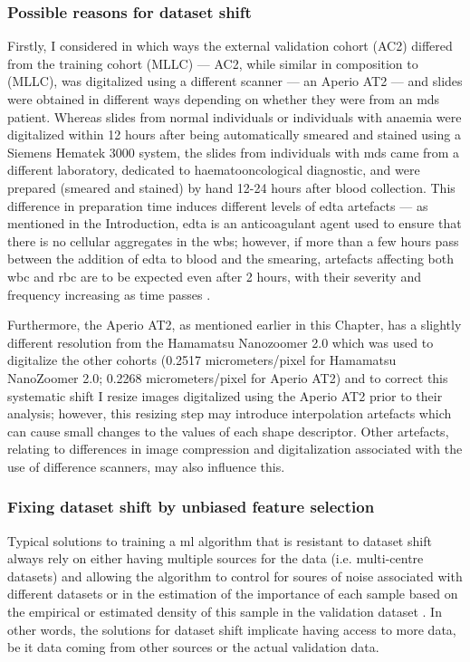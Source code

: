 \subsubsection{Possible reasons for dataset shift} 

Firstly, I considered in which ways the external validation cohort (AC2) differed from the training cohort (MLLC) --- AC2, while similar in composition to (MLLC), was digitalized using a different scanner --- an Aperio AT2 --- and slides were obtained in different ways depending on whether they were from an \ac{mds} patient. Whereas slides from normal individuals or individuals with anaemia were digitalized within 12 hours after being automatically smeared and stained using a Siemens Hematek 3000 system, the slides from individuals with \ac{mds} came from a different laboratory, dedicated to haematooncological diagnostic, and were prepared (smeared and stained) by hand 12-24 hours after blood collection. This difference in preparation time induces different levels of \ac{edta} artefacts --- as mentioned in the Introduction, \ac{edta} is an anticoagulant agent used to ensure that there is no cellular aggregates in the \ac{wbs}; however, if more than a few hours pass between the addition of \ac{edta} to blood and the smearing, artefacts affecting both \ac{wbc} and \ac{rbc} are to be expected even after 2 hours, with their severity and frequency increasing as time passes \cite{Bain2005-zg,Narasimha2008-fh}.

Furthermore, the Aperio AT2, as mentioned earlier in this Chapter, has a slightly different resolution from the Hamamatsu Nanozoomer 2.0 which was used to digitalize the other cohorts (0.2517 micrometers/pixel for Hamamatsu NanoZoomer 2.0; 0.2268 micrometers/pixel for Aperio AT2) and to correct this systematic shift I resize images digitalized using the Aperio AT2 prior to their analysis; however, this resizing step may introduce interpolation artefacts which can cause small changes to the values of each shape descriptor. Other artefacts, relating to differences in image compression and digitalization associated with the use of difference scanners, may also influence this.

\subsubsection{Fixing dataset shift by unbiased feature selection} 

Typical solutions to training a \ac{ml} algorithm that is resistant to dataset shift always rely on either having multiple sources for the data (i.e. multi-centre datasets) and allowing the algorithm to control for soures of noise associated with different datasets or in the estimation of the importance of each sample based on the empirical or estimated density of this sample in the validation dataset \cite{Y2019-vc}. In other words, the solutions for dataset shift implicate having access to more data, be it data coming from other sources or the actual validation data.

